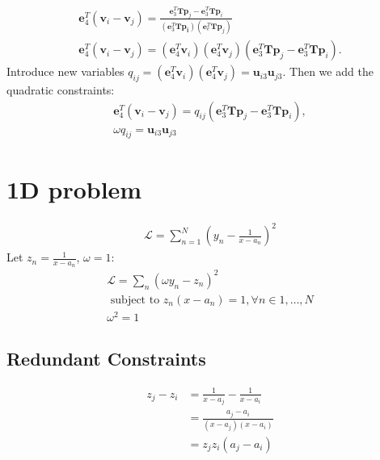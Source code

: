 \documentclass{article}
\newcommand{\mbf}[1]{\mathbf{#1}}
\begin{document}
\begin{align}
    \mbf{e}_4^T (\mbf{v}_i - \mbf{v}_j) = \frac{\mbf{e}_3^T \mbf{T} \mbf{p}_j - \mbf{e}_3^T \mbf{T} \mbf{p}_i}{(\mbf{e}_3 ^T \mbf{T} \mbf{p_i})(\mbf{e}_e^T \mbf{T} \mbf{p}_j)} \\
    \mbf{e}_4^T (\mbf{v}_i - \mbf{v}_j) = (\mbf{e}_4^T \mbf{v}_i )(\mbf{e}_4^T \mbf{v}_j ) (\mbf{e}_3^T \mbf{T} \mbf{p}_j - \mbf{e}_3^T \mbf{T} \mbf{p}_i).
\end{align}
Introduce new variables $q_{ij} = (\mbf{e}_4^T \mbf{v}_i ) (\mbf{e}_4^T \mbf{v}_j )= \mbf{u}_{i3} \mbf{u}_{j3}$.
Then we add the quadratic constraints:
\begin{align}
    \mbf{e}_4^T (\mbf{v}_i - \mbf{v}_j) = q_{ij} (\mbf{e}_3^T \mbf{T} \mbf{p}_j - \mbf{e}_3^T \mbf{T} \mbf{p}_i), \\
    \omega q_{ij} = \mbf{u}_{i3} \mbf{u}_{j3}
\end{align}


\section{1D problem}


\begin{align}
    \mathcal{L} = \sum_{n = 1}^N \left( y_n - \frac{1}{x - a_n}\right)^2
\end{align}
Let $z_n = \frac{1}{x - a_n}$, $\omega = 1$:
\begin{align}
    \mathcal{L} = \sum_n \left( \omega y_n - z_n \right)^2 \\
    \text{ subject to }  z_n(x - a_n) = 1, \forall n \in {1, \dots, N} \\
    \omega^2 = 1
\end{align}

\subsection{Redundant Constraints}

\begin{align}
    z_j - z_i  &= \frac{1}{x - a_j} - \frac{1}{x - a_i}\\
    &= \frac{a_j - a_i}{(x - a_j)(x - a_i)} \\
    &= z_j z_i (a_j - a_i)
\end{align}
\end{document}
